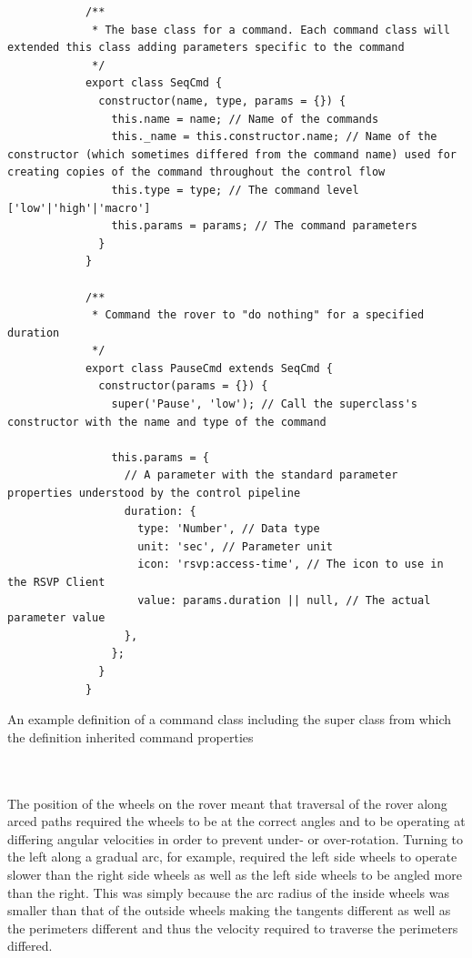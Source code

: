         \begin{code}
          \begin{verbatim}
            /**
             * The base class for a command. Each command class will extended this class adding parameters specific to the command
             */
            export class SeqCmd {
              constructor(name, type, params = {}) {
                this.name = name; // Name of the commands
                this._name = this.constructor.name; // Name of the constructor (which sometimes differed from the command name) used for creating copies of the command throughout the control flow
                this.type = type; // The command level ['low'|'high'|'macro']
                this.params = params; // The command parameters
              }
            }
            
            /**
             * Command the rover to "do nothing" for a specified duration
             */
            export class PauseCmd extends SeqCmd {
              constructor(params = {}) {
                super('Pause', 'low'); // Call the superclass's constructor with the name and type of the command
            
                this.params = {
                  // A parameter with the standard parameter properties understood by the control pipeline
                  duration: {
                    type: 'Number', // Data type
                    unit: 'sec', // Parameter unit
                    icon: 'rsvp:access-time', // The icon to use in the RSVP Client
                    value: params.duration || null, // The actual parameter value
                  },
                };
              }
            }
          \end{verbatim}
          \caption{An example definition of a command class including the super class from which the definition inherited command properties}
          \label{code:commandDefExample}
        \end{code}
        
        
       \\\\
        The position of the wheels on the rover meant that traversal of the rover along arced paths required the wheels to be at the correct angles and to be operating at differing angular velocities in order to prevent under- or over-rotation. Turning to the left along a gradual arc, for example, required the left side wheels to operate slower than the right side wheels as well as the left side wheels to be angled more than the right. This was simply because the arc radius of the inside wheels was smaller than that of the outside wheels making the tangents different as well as the perimeters different and thus the velocity required to traverse the perimeters differed.
        
